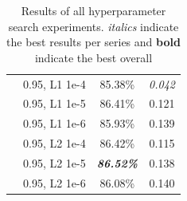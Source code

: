 {{\begin{table}[t]
\begin{tabular}{c|c|cc}
                 & 0.95, L1 1e-4  &      85.38\%               &   \emph{0.042}                  \\
                 & 0.95, L1 1e-5                    &     86.41\%                &              0.121           \\
                 & 0.95, L1 1e-6                   &    85.93\%                 &      0.139                   \\
                 & 0.95, L2 1e-4                   &     86.42\%                &      0.115                   \\
                 & 0.95, L2 1e-5                   &   \textbf{\emph{86.52\%}}                  &      0.138                   \\
                 & 0.95, L2 1e-6                   &  86.08\%                  &      0.140                   \\
    \bottomrule
    \end{tabular}
    \caption{Results of all hyperparameter search experiments. \emph{italics} indicate the best results per series and \textbf{bold} indicate the best overall}
    \label{tab:hp_search}
\end{table}
}
}


